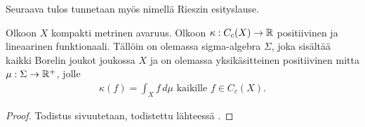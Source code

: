 \documentclass[12pt,oneside,a4paper]{amsbook} %
\begin{document}
Seuraava tulos tunnetaan myös nimellä Rieszin esityslause.

\begin{theorem}\label{thm:Riesz}
    Olkoon $X$ kompakti metrinen avaruus. Olkoon $\kappa:C_c(X) \to \mathbb{R}$ positiivinen ja lineaarinen funktionaali. Tällöin on olemassa sigma-algebra $\Sigma$, joka sisältää kaikki Borelin joukot joukossa $X$ ja on olemassa yksikäsitteinen positiivinen mitta $\mu:\Sigma \to {\mathbb{R}^{+}}$, jolle
    \begin{align*}
        \kappa (f) = \int_X f \, d\mu \text{ kaikille } f \in C_c(X).
    \end{align*}
\end{theorem}
\begin{proof}
    Todistus sivuutetaan, todistettu lähteessä \cite[s. 40]{rudin}.
\end{proof}
\end{document}
